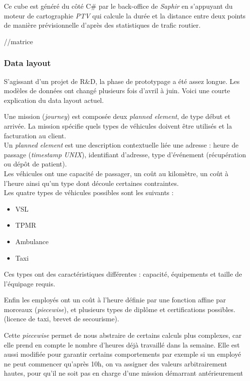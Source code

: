 \documentclass[french, 11pt]{memoir}
\begin{document}
\bigskip
 Ce cube est généré du côté
C\# par le back-office de \emph{Saphir} en s'appuyant du moteur de
cartographie \emph{PTV }qui calcule la durée et la distance entre deux
points de manière prévisionnelle d'après des statistiques de trafic
routier.

//matrice

\subsubsection{Data layout}\label{data-layout}

S'agissant d'un projet de R\&D, la phase de prototypage a été assez
longue. Les modèles de données ont changé plusieurs fois d'avril à juin.
Voici une courte explication du data layout actuel.

\bigskip
Une mission (\emph{journey}) est composée deux \textit{planned element},
	de type début et arrivée. La mission spécifie quels types de véhicules
	doivent être utilisés et la facturation au client. \\
	Un\textit{ planned element}
est une description contextuelle liée une adresse : heure de passage
(\emph{timestamp UNIX}), identifiant d'adresse, type d'événement
(récupération ou dépôt de patient). \\ Les véhicules ont une capacité de
passager, un coût au kilomètre, un coût à l'heure ainsi qu'un type dont
découle certaines contraintes.\\
 Les quatre types de véhicules possibles
sont les suivants :

\begin{itemize}
	\item
	VSL
	\item
	TPMR
	\item
	Ambulance
	\item
	Taxi
\end{itemize}

\bigskip
Ces types ont des caractéristiques différentes : capacité, équipements
et taille de l'équipage requis. 

\bigskip
Enfin les employés ont un coût à l'heure définie par une fonction affine
par morceaux (\emph{piecewise}), et plusieurs types de diplôme et
certifications possibles. (licence de taxi, brevet de secourisme).

Cette \textit{piecewise} permet de nous abstraire de certains calculs plus
complexes, car elle prend en compte le nombre d'heures déjà travaillé
dans la semaine. Elle est aussi modifiée pour garantir certains
comportements par exemple si un employé ne peut commencer qu'après 10h,
on va assigner des valeurs arbitrairement hautes, pour qu'il ne soit pas
en charge d'une mission démarrant antérieurement
\end{document}
